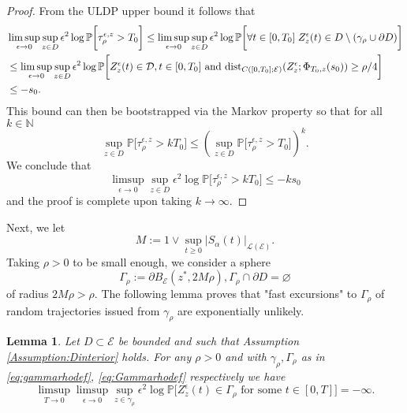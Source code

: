 \documentclass[10pt, reqno]{amsart}
\newcommand{\N}{\mathbb{N}}
\newcommand{\pr}{\mathbb{P}}
\newcommand{\e}{\mathcal{E}}
\newtheorem{lem}{Lemma}
\theoremstyle{definition}
\numberwithin{lem}{section}
\numberwithin{cor}{section}
\numberwithin{prop}{section}
\numberwithin{thm}{section}
\numberwithin{dfn}{section}
\begin{document}
\begin{proof}
From the ULDP upper bound %
it follows that 
\begin{equation*}
\begin{aligned}
  &\limsup_{\epsilon\to 0}\sup_{z\in D}\epsilon^2\log\pr\bigg[ \tau^{\epsilon, z}_{\rho}>T_0  \bigg]\leq    \limsup_{\epsilon\to 0}\sup_{z\in D}\epsilon^2\log\pr\bigg[\forall t\in [0, T_0]\;   Z_z^{\epsilon}(t)\in D\setminus(\gamma_\rho\cup\partial D )\bigg]\\&
  \leq  \limsup_{\epsilon\to 0}\sup_{z\in D}\epsilon^2\log\pr\bigg[ Z^\epsilon_z(t) \in \mathcal{D}, t \in [0,T_0] \text{ and }  \textnormal{dist}_{C([0,T_0];\e)}(Z_z^{\epsilon}; \Phi_{T_0, z}(s_0))\geq \rho/4\bigg]
  \\& \leq -s_0.
\end{aligned}   
\end{equation*}
This bound can then be bootstrapped via the Markov property so that for all $k\in\N$
\[\sup_{z\in D}\pr\bigg[ \tau^{\epsilon, z}_{\rho}>kT_0   \bigg] \leq \left( \sup_{z\in D}\pr\bigg[ \tau^{\epsilon, z}_{\rho}>T_0   \bigg]\right)^k.\]
We conclude that 
\begin{equation*}
    \limsup_{\epsilon\to 0}\sup_{z\in D}\epsilon^2\log\pr\bigg[ \tau^{\epsilon, z}_{\rho}>kT_0   \bigg]\leq -ks_0
\end{equation*}
and the proof is complete upon taking $k\to\infty.$
\end{proof}

Next, we let 
\begin{equation}\label{eq:Mdefinition}
    M:=1\vee \sup_{t\geq 0}|S_\alpha(t)|_{\mathscr{L}(\e)}. 
\end{equation}
Taking $\rho>0$ to be small enough, we consider a sphere
\begin{equation}\label{eq:Gammarhodef}
    \Gamma_\rho:=\partial B_\e(z^*, 2M\rho), \Gamma_\rho\cap\partial D=\varnothing 
\end{equation} 
of radius $2M\rho>\rho.$ The following lemma proves that "fast excursions" to $\Gamma_\rho$ of random trajectories issued from $\gamma_\rho$ are exponentially unlikely.
\begin{lem}\label{lem:fastexcursions} Let $D\subset\e$ be bounded and such that Assumption \ref{Assumption:Dinterior} holds.
    For any $\rho>0$ and with $\gamma_\rho, 
    \Gamma_\rho$ as in \eqref{eq:gammarhodef}, \eqref{eq:Gammarhodef} respectively we have
    \begin{equation*}
        \limsup_{T \to 0} \limsup_{\epsilon \to 0} \sup_{z \in \gamma_\rho} \epsilon^2 \log \pr\bigg[Z^{\epsilon}_z(t) \in \Gamma_\rho \text{ for some } t \in [0,T] \bigg] = -\infty.
    \end{equation*}
\end{lem}
\end{document}
